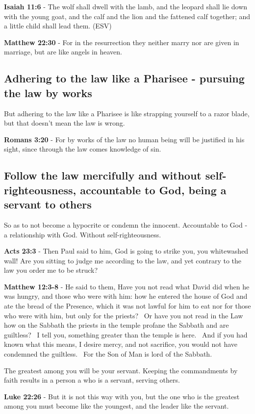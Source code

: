 \documentclass[11pt]{article}
\begin{document}
\textbf{Isaiah 11:6} - The wolf shall dwell with the lamb, and the leopard shall lie down with the young goat, and the calf and the lion and the fattened calf together; and a little child shall lead them. (ESV)

\textbf{Matthew 22:30} - For in the resurrection they neither marry nor are given in marriage, but are like angels in heaven.

\subsection{Adhering to the law like a Pharisee - pursuing the law by works}
\label{sec:org1b27032}
But adhering to the law like a Pharisee is like strapping yourself to a razor blade, but that doesn't mean the law is wrong.

\textbf{Romans 3:20} - For by works of the law no human being will be justified in his sight, since through the law comes knowledge of sin.

\subsection{Follow the law mercifully and without self-righteousness, accountable to God, being a servant to others}
\label{sec:orgfccd9d7}
So as to not become a hypocrite or condemn the innocent.
Accountable to God - a relationship with God.
Without self-righteousness.

\textbf{Acts 23:3} - Then Paul said to him, God is going to strike you, you whitewashed wall! Are you sitting to judge me according to the law, and yet contrary to the law you order me to be struck?

\textbf{Matthew 12:3-8} - He said to them, Have you not read what David did when he was hungry, and those who were with him: how he entered the house of God and ate the bread of the Presence, which it was not lawful for him to eat nor for those who were with him, but only for the priests?  Or have you not read in the Law how on the Sabbath the priests in the temple profane the Sabbath and are guiltless?  I tell you, something greater than the temple is here.  And if you had known what this means, I desire mercy, and not sacrifice, you would not have condemned the guiltless.  For the Son of Man is lord of the Sabbath.

The greatest among you will be your servant.
Keeping the commandments by faith results in a person a who is a servant, serving others.

\textbf{Luke 22:26} - But it is not this way with you, but the one who is the greatest among you must become like the youngest, and the leader like the servant.
\end{document}
